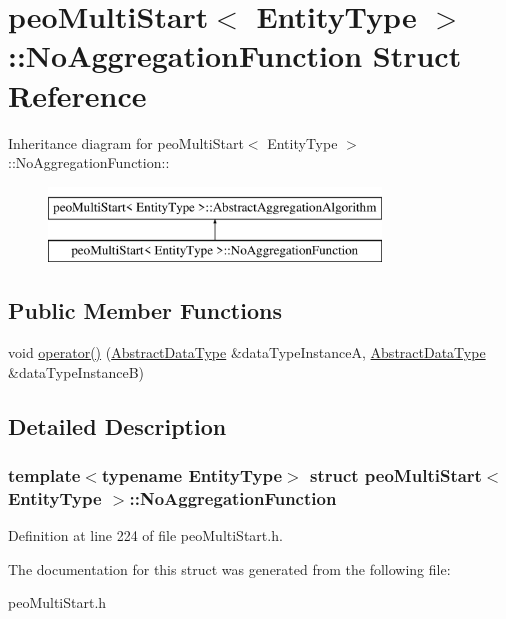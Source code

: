 \hypertarget{structpeoMultiStart_1_1NoAggregationFunction}{
\section{peo\-Multi\-Start$<$ Entity\-Type $>$::No\-Aggregation\-Function Struct Reference}
\label{structpeoMultiStart_1_1NoAggregationFunction}
}
Inheritance diagram for peo\-Multi\-Start$<$ Entity\-Type $>$::No\-Aggregation\-Function::\begin{figure}[H]
\begin{center}
\leavevmode
\includegraphics[height=2cm]{structpeoMultiStart_1_1NoAggregationFunction}
\end{center}
\end{figure}
\subsection*{Public Member Functions}
\begin{CompactItemize}
\item 
\hypertarget{structpeoMultiStart_1_1NoAggregationFunction_985f527d01dcc73e2c600b7293ace1c7}{
void \hyperlink{structpeoMultiStart_1_1NoAggregationFunction_985f527d01dcc73e2c600b7293ace1c7}{operator()} (\hyperlink{structpeoMultiStart_1_1AbstractDataType}{Abstract\-Data\-Type} \&data\-Type\-Instance\-A, \hyperlink{structpeoMultiStart_1_1AbstractDataType}{Abstract\-Data\-Type} \&data\-Type\-Instance\-B)}
\label{structpeoMultiStart_1_1NoAggregationFunction_985f527d01dcc73e2c600b7293ace1c7}

\end{CompactItemize}


\subsection{Detailed Description}
\subsubsection*{template$<$typename Entity\-Type$>$ struct peo\-Multi\-Start$<$ Entity\-Type $>$::No\-Aggregation\-Function}





Definition at line 224 of file peo\-Multi\-Start.h.

The documentation for this struct was generated from the following file:\begin{CompactItemize}
\item 
peo\-Multi\-Start.h\end{CompactItemize}
